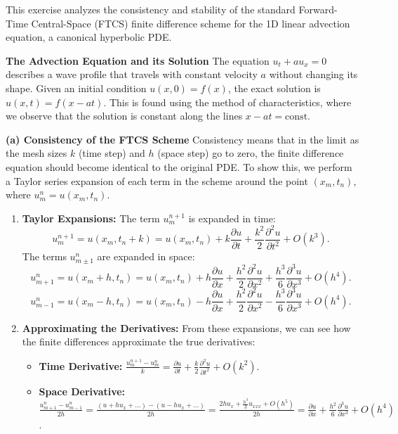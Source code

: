 \begin{solution}
This exercise analyzes the consistency and stability of the standard Forward-Time Central-Space (FTCS) finite difference scheme for the 1D linear advection equation, a canonical hyperbolic PDE.

\textbf{The Advection Equation and its Solution}
The equation $u_t + a u_x = 0$ describes a wave profile that travels with constant velocity $a$ without changing its shape. Given an initial condition $u(x,0) = f(x)$, the exact solution is $u(x,t) = f(x-at)$. This is found using the method of characteristics, where we observe that the solution is constant along the lines $x - at = \text{const}$.

\textbf{(a) Consistency of the FTCS Scheme}
Consistency means that in the limit as the mesh sizes $k$ (time step) and $h$ (space step) go to zero, the finite difference equation should become identical to the original PDE. To show this, we perform a Taylor series expansion of each term in the scheme around the point $(x_m, t_n)$, where $u_m^n = u(x_m, t_n)$.

\begin{enumerate}
    \item \textbf{Taylor Expansions:}
    The term $u_m^{n+1}$ is expanded in time:
    \[ u_m^{n+1} = u(x_m, t_n+k) = u(x_m, t_n) + k \frac{\partial u}{\partial t} + \frac{k^2}{2} \frac{\partial^2 u}{\partial t^2} + O(k^3). \]
    The terms $u_{m\pm 1}^n$ are expanded in space:
    \[ u_{m+1}^n = u(x_m+h, t_n) = u(x_m, t_n) + h \frac{\partial u}{\partial x} + \frac{h^2}{2} \frac{\partial^2 u}{\partial x^2} + \frac{h^3}{6} \frac{\partial^3 u}{\partial x^3} + O(h^4). \]
    \[ u_{m-1}^n = u(x_m-h, t_n) = u(x_m, t_n) - h \frac{\partial u}{\partial x} + \frac{h^2}{2} \frac{\partial^2 u}{\partial x^2} - \frac{h^3}{6} \frac{\partial^3 u}{\partial x^3} + O(h^4). \]
    
    \item \textbf{Approximating the Derivatives:}
    From these expansions, we can see how the finite differences approximate the true derivatives:
    \begin{itemize}
        \item \textbf{Time Derivative:} $\frac{u_m^{n+1} - u_m^n}{k} = \frac{\partial u}{\partial t} + \frac{k}{2} \frac{\partial^2 u}{\partial t^2} + O(k^2)$.
        \item \textbf{Space Derivative:} $\frac{u_{m+1}^n - u_{m-1}^n}{2h} = \frac{(u+h u_x + \dots) - (u-h u_x + \dots)}{2h} = \frac{2h u_x + \frac{h^3}{3}u_{xxx} + O(h^5)}{2h} = \frac{\partial u}{\partial x} + \frac{h^2}{6} \frac{\partial^3 u}{\partial x^3} + O(h^4)$.
    \end{itemize}
    

\end{enumerate}
\end{solution}
